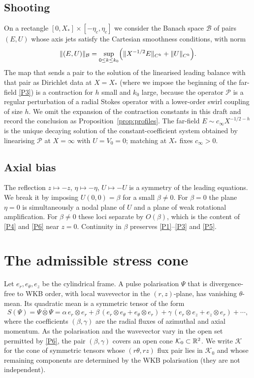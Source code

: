\subsection{Shooting}

On a rectangle $[0,X_*]\times[-\eta_c,\eta_c]$ we consider the Banach space $\mathcal B$ of pairs $(E,U)$ whose axis jets satisfy the Cartesian smoothness conditions, with norm
\[
\|(E,U)\|_{\mathcal B}
=\sup_{0\le k\le k_0}\Bigl(
\|X^{-1/2}E\|_{C^k}+\|U\|_{C^k}
\Bigr).
\]
The map that sends a pair to the solution of the linearised leading balance with that pair as Dirichlet data at $X=X_*$ (where we impose the beginning of the far-field \ref{P3}) is a contraction for $h$ small and $k_0$ large, because the operator $\mathcal P$ is a regular perturbation of a radial {S}tokes operator with a lower-order swirl coupling of size $h$. We omit the expansion of the contraction constants in this draft and record the conclusion as Proposition~\ref{prop:profiles}. The far-field $E\sim c_\infty X^{-1/2-h}$ is the unique decaying solution of the constant-coefficient system obtained by linearising $\mathcal P$ at $X=\infty$ with $U=V_0=0$; matching at $X_*$ fixes $c_\infty>0$.

\subsection{Axial bias}

The reflection $z\mapsto -z$, $\eta\mapsto -\eta$, $U\mapsto -U$ is a symmetry of the leading equations. We break it by imposing $U(0,0)=\beta$ for a small $\beta\neq 0$. For $\beta=0$ the plane $\eta=0$ is simultaneously a nodal plane of $U$ and a plane of weak rotational amplification. For $\beta\neq 0$ these loci separate by $O(\beta)$, which is the content of \ref{P4} and \ref{P6} near $z=0$. Continuity in $\beta$ preserves \ref{P1}--\ref{P3} and \ref{P5}.

\section{The admissible stress cone}
\label{app:cone}

Let $e_r,e_\theta,e_z$ be the cylindrical frame. A pulse polarisation $\Psi$ that is divergence-free to WKB order, with local wavevector in the $(r,z)$-plane, has vanishing $\theta$-mean. Its quadratic mean is a symmetric tensor of the form
\[
S(\Psi)
=\overline{\Psi\otimes\Psi}
=\alpha\, e_r\otimes e_r
+\beta\, (e_r\otimes e_\theta+e_\theta\otimes e_r)
+\gamma\, (e_r\otimes e_z+e_z\otimes e_r)
+\cdots,
\]
where the coefficients $(\beta,\gamma)$ are the radial fluxes of azimuthal and axial momentum. As the polarisation and the wavevector vary in the open set permitted by \ref{P6}, the pair $(\beta,\gamma)$ covers an open cone $\mathcal K_0\subset\mathbb{R}^2$. We write $\mathcal K$ for the cone of symmetric tensors whose $(r\theta,rz)$ flux pair lies in $\mathcal K_0$ and whose remaining components are determined by the WKB polarisation (they are not independent).

